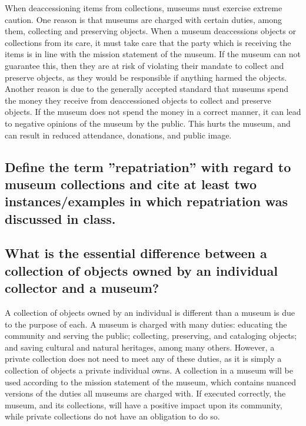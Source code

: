 \documentclass[11pt]{article}
\begin{document}
When deaccessioning items from collections, museums must exercise extreme caution. One reason is that museums are charged with certain duties, among them, collecting and preserving objects. When a museum deaccessions objects or collections from its care, it must take care that the party which is receiving the items is in line with the mission statement of the museum. If the museum can not guarantee this, then they are at risk of violating their mandate to collect and preserve objects, as they would be responsible if anything harmed the objects. Another reason is due to the generally accepted standard that museums spend the money they receive from deaccessioned objects to collect and preserve objects. If the museum does not spend the money in a correct manner, it can lead to negative opinions of the museum by the public. This hurts the museum, and can result in reduced attendance, donations, and public image.

\begin{singlespacing}
\subsection*{Define the term ''repatriation'' with regard to museum collections and cite at least two instances/examples in which repatriation was discussed in class.}
\end{singlespacing}

\begin{singlespacing}
\subsection*{What is the essential difference between a collection of objects owned by an individual collector and a museum?}
\end{singlespacing}

A collection of objects owned by an individual is different than a museum is due to the purpose of each. A museum is charged with many duties: educating the community and serving the public; collecting, preserving, and cataloging objects; and saving cultural and natural heritages, among many others. However, a private collection does not need to meet any of these duties, as it is simply a collection of objects a private individual owns. A collection in a museum will be used according to the mission statement of the museum, which contains nuanced versions of the duties all museums are charged with. If executed correctly, the museum, and its collections, will have a positive impact upon its community, while private collections do not have an obligation to do so.
\end{document}
